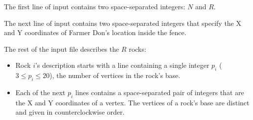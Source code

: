 The first line of input contains two space-separated integers: $N$ and $R$. 

The next line of input contains two space-separated integers that specify the X and Y coordinates of Farmer Don's location inside the fence.

The rest of the input file describes the $R$ rocks: 

\begin{itemize}
\item Rock $i$'s description starts with a line containing a single integer $p_i$ ($3 \leq p_i \leq 20$), the number of vertices in the rock's base.

\item Each of the next $p_i$ lines contains a space-separated pair of integers that are the X and Y coordinates of a vertex. The vertices of a rock's base are distinct and given in counterclockwise order.
\end{itemize}